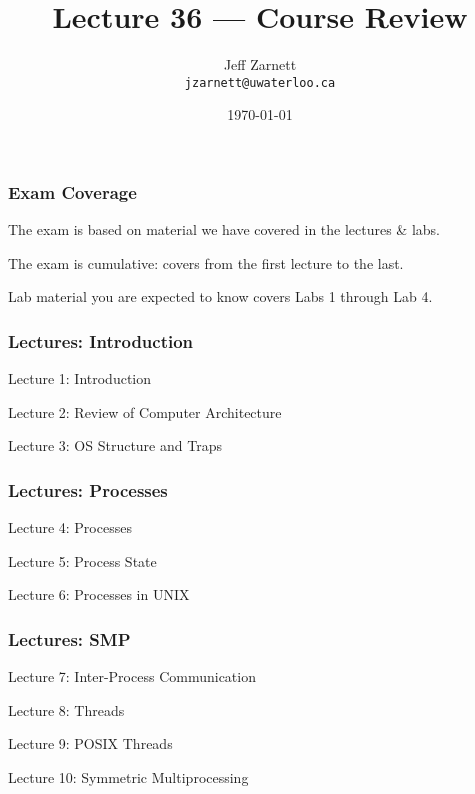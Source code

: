 

\title{Lecture 36 --- Course Review }

\author{Jeff Zarnett \\ \small \texttt{jzarnett@uwaterloo.ca}}
\date{\today}




\begin{frame}
  \titlepage

 \end{frame}


\begin{frame}
\frametitle{Exam Coverage}

The exam is based on material we have covered in the lectures \& labs.

The exam is cumulative: covers from the first lecture to the last.

Lab material you are expected to know covers Labs 1 through Lab 4.

\end{frame}

\begin{frame}
\frametitle{Lectures: Introduction}

{\LARGE
Lecture 1: Introduction

Lecture 2: Review of Computer Architecture

Lecture 3: OS Structure and Traps
}

\end{frame}

\begin{frame}
\frametitle{Lectures: Processes}

{\LARGE
Lecture 4: Processes

Lecture 5: Process State

Lecture 6: Processes in UNIX
}

\end{frame}

\begin{frame}
\frametitle{Lectures: SMP}

{\LARGE
Lecture 7: Inter-Process Communication

Lecture 8: Threads

Lecture 9: POSIX Threads

Lecture 10: Symmetric Multiprocessing
}

\end{frame}


